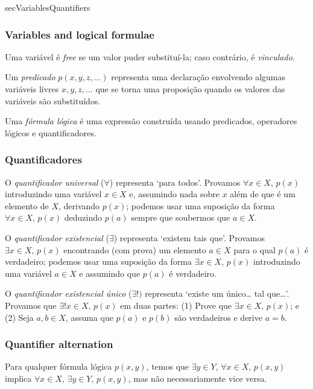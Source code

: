 \begin{tldr}{secVariablesQuantifiers}

\subsubsection*{Variables and logical formulae}

\begin{tldrlist}
Uma variável é \textit{free} se um valor puder substituí-la; caso contrário, é \textit{vinculado}.

Um \textit{predicado} $p(x,y,z,\dots)$ representa uma declaração envolvendo algumas variáveis ​​livres $x,y,z,\dots{}$ que se torna uma proposição quando os valores das variáveis ​​são substituídos.

Uma \textit{fórmula lógica} é uma expressão construída usando predicados, operadores lógicos e quantificadores.
\end{tldrlist}

\subsubsection*{Quantificadores}

\begin{tldrlist}
O \textit{quantificador universal} ($\forall$) representa `para todos'. Provamos $\forall x \in X,\, p(x)$ introduzindo uma variável $x \in X$ e, assumindo nada sobre $x$ além de que é um elemento de $X$, derivando $p (x)$; podemos usar uma suposição da forma $\forall x \in X,\, p(x)$ deduzindo $p(a)$ sempre que soubermos que $a \in X$.

O \textit{quantificador existencial} ($\exists$) representa `existem\pontos{} tais que\pontos{}'. Provamos $\exists x \in X,\, p(x)$ encontrando (com prova) um elemento $a \in X$ para o qual $p(a)$ é verdadeiro; podemos usar uma suposição da forma $\exists x \in X,\, p(x)$ introduzindo uma variável $a \in X$ e assumindo que $p(a)$ é verdadeiro.

O \textit{quantificador existencial único} ($\exists !)$ representa `existe um único\dots{} tal que\dots{}'. Provamos que $\exists! x \in X,\, p(x)$ em duas partes: (1) Prove que $\exists x \in X,\, p(x)$; e (2) 
Seja $a,b \in X$, assuma que $p(a)$ e $p(b)$ são verdadeiros e derive $a=b$.
\end{tldrlist}

\subsubsection*{Quantifier alternation}

\begin{tldrlist}
Para qualquer fórmula lógica $p(x,y)$, temos que $\exists y \in Y,\, \forall x \in X,\, p(x,y)$ implica $\forall x \in X ,\, \exists y \in Y,\, p(x,y)$, mas não necessariamente vice versa.
\end{tldrlist}

\end{tldr}
